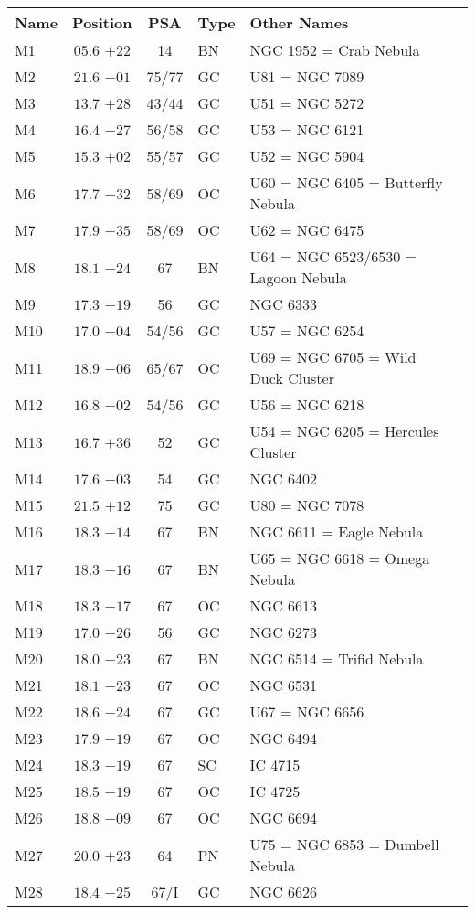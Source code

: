 \begin{table}[t]
\setlength{\tabcolsep}{2pt}
\small
\begin{tabular}{lcclll}
\hline
Name&Position&PSA&Type&Other Names\\
\hline
M1   &$05.6$ $+22$&14&BN &NGC 1952 = Crab Nebula\\
M2   &$21.6$ $-01$&75/77&GC &U81 = NGC 7089\\
M3   &$13.7$ $+28$&43/44&GC &U51 = NGC 5272\\
M4   &$16.4$ $-27$&56/58&GC &U53 = NGC 6121\\
M5   &$15.3$ $+02$&55/57&GC &U52 = NGC 5904\\
M6   &$17.7$ $-32$&58/69&OC &U60 = NGC 6405 = Butterfly Nebula\\
M7   &$17.9$ $-35$&58/69&OC &U62 = NGC 6475\\
M8   &$18.1$ $-24$&67&BN &U64 = NGC 6523/6530 = Lagoon Nebula\\
M9   &$17.3$ $-19$&56&GC &NGC 6333\\
M10  &$17.0$ $-04$&54/56&GC &U57 = NGC 6254\\
M11  &$18.9$ $-06$&65/67&OC &U69 = NGC 6705 = Wild Duck Cluster\\
M12  &$16.8$ $-02$&54/56&GC &U56 = NGC 6218\\
M13  &$16.7$ $+36$&52&GC &U54 = NGC 6205 = Hercules Cluster\\
M14  &$17.6$ $-03$&54&GC &NGC 6402\\
M15  &$21.5$ $+12$&75&GC &U80 = NGC 7078\\
M16  &$18.3$ $-14$&67&BN &NGC 6611 = Eagle Nebula\\
M17  &$18.3$ $-16$&67&BN &U65 = NGC 6618 = Omega Nebula\\
M18  &$18.3$ $-17$&67&OC &NGC 6613\\
M19  &$17.0$ $-26$&56&GC &NGC 6273\\
M20  &$18.0$ $-23$&67&BN &NGC 6514 = Trifid Nebula\\
M21  &$18.1$ $-23$&67&OC &NGC 6531\\
M22  &$18.6$ $-24$&67&GC &U67 = NGC 6656\\
M23  &$17.9$ $-19$&67&OC &NGC 6494\\
M24  &$18.3$ $-19$&67&SC &IC 4715\\
M25  &$18.5$ $-19$&67&OC &IC 4725\\
M26  &$18.8$ $-09$&67&OC &NGC 6694\\
M27  &$20.0$ $+23$&64&PN &U75 = NGC 6853 = Dumbell Nebula\\
M28  &$18.4$ $-25$&67/I&GC &NGC 6626\\

\end{tabular}
\end{table}
